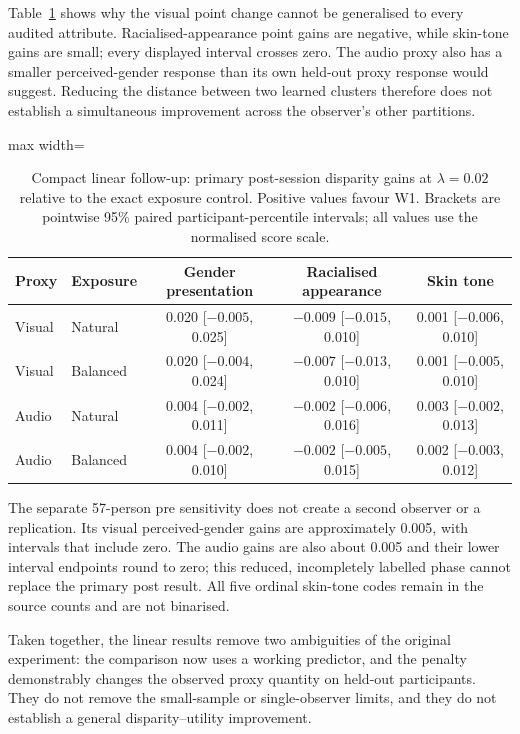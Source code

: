 Table~\ref{tab:compact-audit-gains} shows why the visual point change cannot be generalised
to every audited attribute. Racialised-appearance point gains are negative, while skin-tone
gains are small; every displayed interval crosses zero. The audio proxy also has a
smaller perceived-gender response than its own held-out proxy response would suggest.
Reducing the distance between two learned clusters therefore does not establish a
simultaneous improvement across the observer's other partitions.

\begin{table}[htbp]
\centering
\caption{Compact linear follow-up: primary post-session disparity gains at $\lambda=0.02$
relative to the exact exposure control. Positive values favour W1. Brackets are pointwise
95\% paired participant-percentile intervals; all values use the normalised score scale.}
\label{tab:compact-audit-gains}
\small
\begin{adjustbox}{max width=\textwidth}
\begin{tabular}{llccc}
\toprule
Proxy & Exposure & Gender presentation & Racialised appearance & Skin tone \\
\midrule
Visual & Natural & 0.020 [$-0.005$, 0.025] & $-0.009$ [$-0.015$, 0.010] & 0.001 [$-0.006$, 0.010] \\
Visual & Balanced & 0.020 [$-0.004$, 0.024] & $-0.007$ [$-0.013$, 0.010] & 0.001 [$-0.005$, 0.010] \\
Audio & Natural & 0.004 [$-0.002$, 0.011] & $-0.002$ [$-0.006$, 0.016] & 0.003 [$-0.002$, 0.013] \\
Audio & Balanced & 0.004 [$-0.002$, 0.010] & $-0.002$ [$-0.005$, 0.015] & 0.002 [$-0.003$, 0.012] \\
\bottomrule
\end{tabular}
\end{adjustbox}
\end{table}
\FloatBarrier

The separate 57-person pre sensitivity does not create a second observer or a replication.
Its visual perceived-gender gains are approximately 0.005, with intervals that include
zero. The audio gains are also about 0.005 and their lower interval endpoints round to
zero; this reduced, incompletely labelled phase cannot replace the primary post result.
All five ordinal skin-tone codes remain in the source counts and are not binarised.

Taken together, the linear results remove two ambiguities of the original experiment:
the comparison now uses a working predictor, and the penalty demonstrably changes the
observed proxy quantity on held-out participants. They do not remove the small-sample or
single-observer limits, and they do not establish a general disparity--utility improvement.

